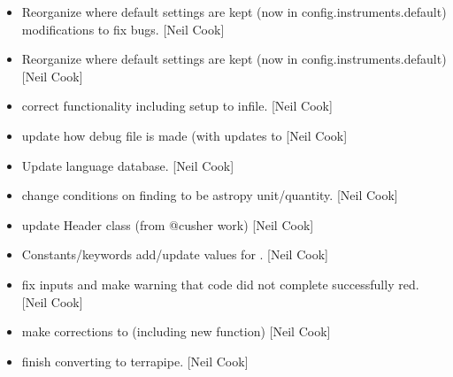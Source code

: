 \documentclass[a4paper,10pt,english]{report}
\begin{document}
\begin{itemize}
\item {} 
Reorganize where default settings are kept (now in
config.instruments.default) \textendash{} modifications to fix bugs. {[}Neil Cook{]}

\item {} 
Reorganize where default settings are kept (now in
config.instruments.default) {[}Neil Cook{]}

\item {} 
 \sphinxhyphen{} correct  functionality including
setup to infile. {[}Neil Cook{]}

\item {} 
 \sphinxhyphen{} update how debug file is made (with updates to
 {[}Neil Cook{]}

\item {} 
Update language database. {[}Neil Cook{]}

\item {} 
 \sphinxhyphen{} change conditions on finding  to be astropy
unit/quantity. {[}Neil Cook{]}

\item {} 
 \sphinxhyphen{} update Header class (from @cusher work) {[}Neil Cook{]}

\item {} 
Constants/keywords \sphinxhyphen{} add/update values for . {[}Neil Cook{]}

\item {} 
 \sphinxhyphen{} fix  inputs and make warning that code
did not complete successfully red. {[}Neil Cook{]}

\item {} 
 \sphinxhyphen{} make corrections to  (including new
 function) {[}Neil Cook{]}

\item {} 
 \sphinxhyphen{} finish converting  to
terrapipe. {[}Neil Cook{]}

\end{itemize}
\end{document}
